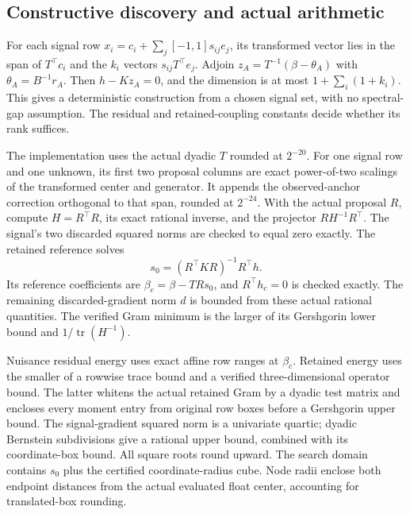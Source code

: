 
\subsection{Constructive discovery and actual arithmetic}
For each signal row $x_i=c_i+\sum_j[-1,1]s_{ij}e_j$, its transformed vector lies in the span of $T^\top c_i$ and the $k_i$ vectors $s_{ij}T^\top e_j$. Adjoin $z_A=T^{-1}(\beta-\theta_A)$ with $\theta_A=B^{-1}r_A$. Then $h-Kz_A=0$, and the dimension is at most $1+\sum_i(1+k_i)$. This gives a deterministic construction from a chosen signal set, with no spectral-gap assumption. The residual and retained-coupling constants decide whether its rank suffices.

The implementation uses the actual dyadic $T$ rounded at $2^{-20}$. For one signal row and one unknown, its first two proposal columns are exact power-of-two scalings of the transformed center and generator. It appends the observed-anchor correction orthogonal to that span, rounded at $2^{-24}$. With the actual proposal $R$, compute $H=R^\top R$, its exact rational inverse, and the projector $RH^{-1}R^\top$. The signal's two discarded squared norms are checked to equal zero exactly. The retained reference solves
\[
 s_0=(R^\top KR)^{-1}R^\top h.
\]
Its reference coefficients are $\beta_c=\beta-TRs_0$, and $R^\top h_c=0$ is checked exactly. The remaining discarded-gradient norm $d$ is bounded from these actual rational quantities. The verified Gram minimum is the larger of its Gershgorin lower bound and $1/\operatorname{tr}(H^{-1})$.

Nuisance residual energy uses exact affine row ranges at $\beta_c$. Retained energy uses the smaller of a rowwise trace bound and a verified three-dimensional operator bound. The latter whitens the actual retained Gram by a dyadic test matrix and encloses every moment entry from original row boxes before a Gershgorin upper bound. The signal-gradient squared norm is a univariate quartic; dyadic Bernstein subdivisions give a rational upper bound, combined with its coordinate-box bound. All square roots round upward. The search domain contains $s_0$ plus the certified coordinate-radius cube. Node radii enclose both endpoint distances from the actual evaluated float center, accounting for translated-box rounding.

